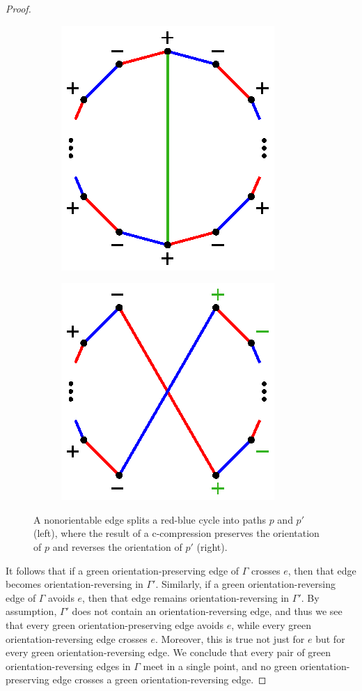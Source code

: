 \documentclass[11pt, oneside]{amsart}
\theoremstyle{theorem}
\theoremstyle{definition}
\theoremstyle{theorem}
\begin{document}
\begin{proof}
\begin{figure}[h!]
\begin{subfigure}{.5\textwidth}
  \centering
  \includegraphics[width=.5\linewidth]{ugh1.eps}
  \label{cpc1}
\end{subfigure}%
\begin{subfigure}{.5\textwidth}
  \centering
  \includegraphics[width=.5\linewidth]{ugh2.eps}
  \label{cpc2}
\end{subfigure}
\caption{A nonorientable edge splits a red-blue cycle into paths $p$ and $p'$ (left), where the result of a c-compression preserves the orientation of $p$ and reverses the orientation of $p'$ (right).}
\label{cpcomp}
\end{figure}

It follows that if a green orientation-preserving edge of $\Gamma$ crosses $e$, then that edge becomes orientation-reversing in $\Gamma'$.  Similarly, if a green orientation-reversing edge of $\Gamma$ avoids $e$, then that edge remains orientation-reversing in $\Gamma'$.  By assumption, $\Gamma'$ does not contain an orientation-reversing edge, and thus we see that every green orientation-preserving edge avoids $e$, while every green orientation-reversing edge crosses $e$.  Moreover, this is true not just for $e$ but for every green orientation-reversing edge.  We conclude that every pair of green orientation-reversing edges in $\Gamma$ meet in a single point, and no green orientation-preserving edge crosses a green orientation-reversing edge.


\end{proof}
\end{document}
